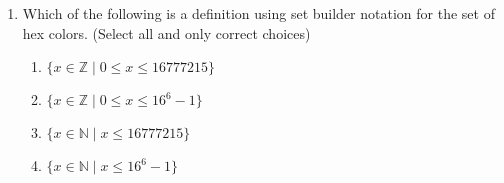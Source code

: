 \documentclass[12pt, oneside]{article}
\begin{document}
\begin{enumerate}
{\begin{enumerate}
\begin{enumerate}
    \item[] $(00FF00)_{16}$
    \item[] $255$
    \item[] $255\cdot 256$
    \item[] $255\cdot 16^2$
    \item[] $65280$
    \end{enumerate}
\item Which of the following is a definition using set builder notation for the set of hex colors. (Select all and only correct choices)
    \begin{enumerate}
    \item[] $\{ x \in \mathbb{Z} \mid 0 \leq x \leq 16777215\}$
    \item[] $\{ x \in \mathbb{Z} \mid 0 \leq x \leq 16^6 -1\}$
    \item[] $\{ x \in \mathbb{N} \mid x \leq 16777215\}$
    \item[] $\{ x \in \mathbb{N} \mid x \leq 16^6 -1\}$
    \end{enumerate}
\end{enumerate} }
\end{enumerate}
\end{document}
